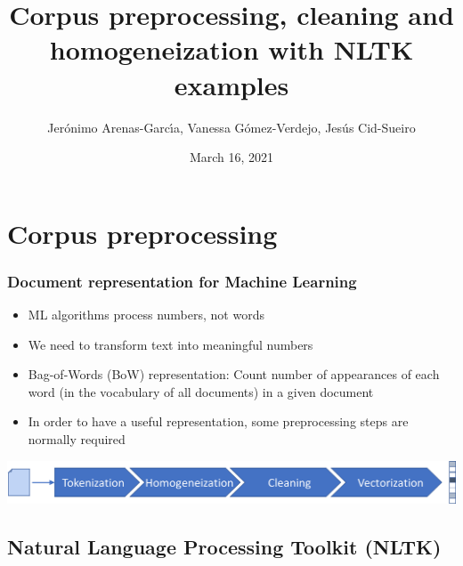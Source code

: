 \documentclass{beamer}
\title[TopicModel]{Corpus preprocessing, cleaning and homogeneization with NLTK examples} %
\author{Jer\'onimo Arenas-Garc\'{\i}a, Vanessa G\'omez-Verdejo, Jes\'us Cid-Sueiro} %
\institute[UC3M] %
{
Universidad Carlos III de Madrid \\ %
\medskip
\textit{jeronimo.arenas@uc3m.es} %
}
\date{March 16, 2021}
\begin{document}
\begin{frame}
\titlepage %
\end{frame}


\section{Corpus preprocessing}


\begin{frame}

    \frametitle{Document representation for Machine Learning}

    \begin{itemize}
  
    	\item ML algorithms process numbers, not words
    	\item We need to transform text into meaningful numbers
    	\item Bag-of-Words (BoW) representation: Count number of appearances of each word (in the vocabulary of all documents) in a given document
    	\item In order to have a useful representation, some preprocessing steps are normally required
    
    \end{itemize}
    
    \vspace{1cm}
    
    \centerline{\includegraphics[width=\textwidth]{./figs/NLPTM_doc_preproc.png}}

\end{frame}


\subsection{Natural Language Processing Toolkit (NLTK)}
\end{document}
